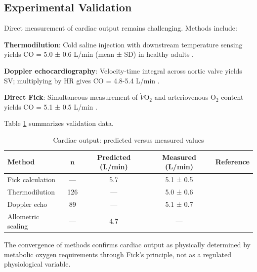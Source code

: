 \subsection{Experimental Validation}

Direct measurement of cardiac output remains challenging. Methods include:

\textbf{Thermodilution}: Cold saline injection with downstream temperature sensing yields CO = 5.0 ± 0.6 L/min (mean ± SD) in healthy adults \cite{ganz1971new}.

\textbf{Doppler echocardiography}: Velocity-time integral across aortic valve yields SV; multiplying by HR gives CO = 4.8-5.4 L/min \cite{lewis1984pulsed}.

\textbf{Direct Fick}: Simultaneous measurement of $\dot{V}\mathrm{O}_{2}$ and arteriovenous O$_{2}$ content yields CO = 5.1 ± 0.5 L/min \cite{lafarge1970pulmonary}.

Table \ref{tab:cardiac_validation} summarizes validation data.

\begin{table}[h]
\centering
\caption{Cardiac output: predicted versus measured values}
\label{tab:cardiac_validation}
\begin{tabular}{lcccc}
\toprule
\textbf{Method} & \textbf{$\boldsymbol{n}$} & \textbf{Predicted (L/min)} & \textbf{Measured (L/min)} & \textbf{Reference} \\
\midrule
Fick calculation & — & 5.7 & 5.1 ± 0.5 & \cite{lafarge1970pulmonary} \\
Thermodilution & 126 & — & 5.0 ± 0.6 & \cite{ganz1971new} \\
Doppler echo & 89 & — & 5.1 ± 0.7 & \cite{lewis1984pulsed} \\
Allometric scaling & — & 4.7 & — & \cite{west1997general} \\
\bottomrule
\end{tabular}
\end{table}

The convergence of methods confirms cardiac output as physically determined by metabolic oxygen requirements through Fick's principle, not as a regulated physiological variable.
